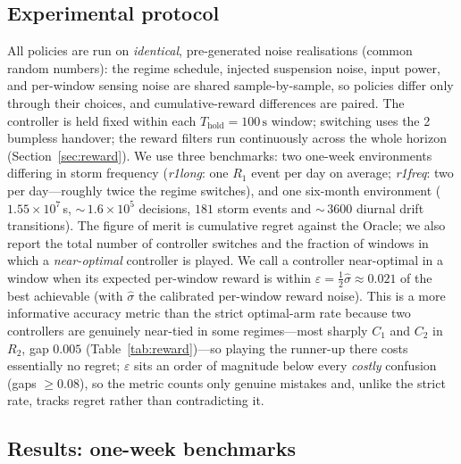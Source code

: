 \documentclass[11pt,a4paper]{article}
\newcommand{\SI}[2]{#1\,\text{#2}}
\newcommand{\Co}{C_{1}}
\newcommand{\Ct}{C_{2}}
\begin{document}
\subsection{Experimental protocol}\label{sec:ba-protocol}
All policies are run on \emph{identical}, pre-generated noise realisations
(common random numbers): the regime schedule, injected suspension noise, input
power, and per-window sensing noise are shared sample-by-sample, so policies
differ only through their choices, and cumulative-reward differences are
paired. The controller is held fixed within each $T_{\mathrm{hold}}=\SI{100}{s}$
window; switching uses the \SI{2}{s} bumpless handover; the reward filters run
continuously across the whole horizon (Section~\ref{sec:reward}). We use three
benchmarks: two one-week environments differing in storm frequency
(\emph{r1long}: one $R_1$ event per day on average; \emph{r1freq}: two per
day---roughly twice the regime switches), and one six-month environment
($1.55\times10^7$\,s, $\sim$\,$1.6\times10^5$ decisions, $181$ storm events and
$\sim$\,$3600$ diurnal drift transitions). The figure of merit is cumulative
regret against the Oracle; we also report the total number of controller
switches and the fraction of windows in which a \emph{near-optimal} controller
is played. We call a controller near-optimal in a window when its expected
per-window reward is within $\varepsilon = \tfrac12\hat\sigma \approx 0.021$ of
the best achievable (with $\hat\sigma$ the calibrated per-window reward noise).
This is a more informative accuracy metric than the strict optimal-arm rate
because two controllers are genuinely near-tied in some regimes---most sharply
$\Co$ and $\Ct$ in $R_2$, gap $0.005$ (Table~\ref{tab:reward})---so playing the
runner-up there costs essentially no regret; $\varepsilon$ sits an order of
magnitude below every \emph{costly} confusion (gaps $\ge 0.08$), so the metric
counts only genuine mistakes and, unlike the strict rate, tracks regret rather
than contradicting it.

\subsection{Results: one-week benchmarks}\label{sec:ba-results}
\end{document}
